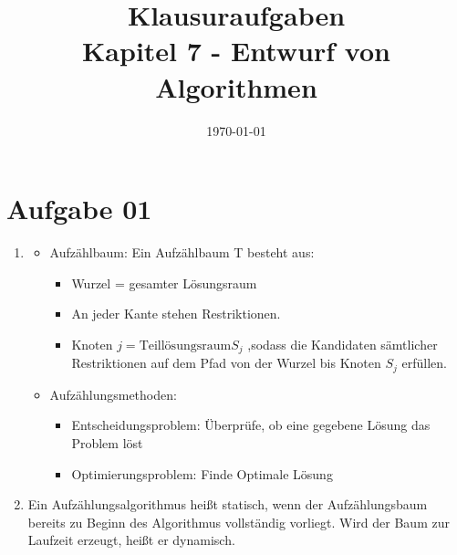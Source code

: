 \documentclass[10pt,a4paper]{article}
\begin{document}
\title{Klausuraufgaben \\
\small{Kapitel 7 - Entwurf von Algorithmen}}
\author{}
\date{\today}
\maketitle

\section*{Aufgabe 01}
    \begin{enumerate}[label={\alph*)}]
        \item
            \begin{itemize}
                \item Aufz\"ahlbaum: Ein Aufzählbaum T besteht aus:
                \begin{itemize}
                    \item Wurzel = gesamter Lösungsraum
                    \item An jeder Kante stehen Restriktionen.
                    \item Knoten $j = \text{Teillösungsraum} S_j
                        $ ,sodass die Kandidaten sämtlicher
                        Restriktionen auf dem Pfad von der Wurzel
                        bis Knoten $S_j $ erfüllen.
                \end{itemize}

                \item Aufz\"ahlungsmethoden: \\
                    \begin{itemize}
                        \item Entscheidungsproblem:
                            \"Uberpr\"ufe, ob eine
                            gegebene L\"osung das
                            Problem l\"ost
                        \item Optimierungsproblem:
                            Finde Optimale L\"osung
                    \end{itemize}

            \end{itemize}

        \item Ein Aufz\"ahlungsalgorithmus hei\ss t statisch, wenn der
            Aufz\"ahlungsbaum bereits zu Beginn des Algorithmus vollst\"andig
            vorliegt. Wird der Baum zur Laufzeit erzeugt, hei\ss t er dynamisch.
    \end{enumerate}
\end{document}
